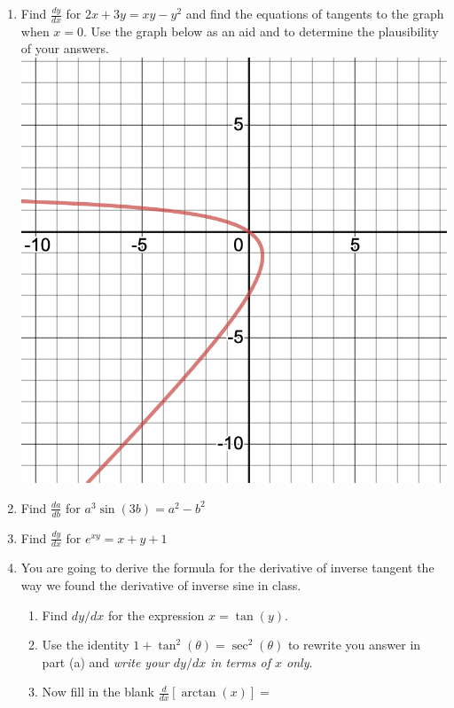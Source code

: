 \documentclass[11pt,fleqn]{article}
\begin{document}
\setlength{\parindent}{0cm}
\renewcommand{\headrulewidth}{0pt}
\newcommand{\blank}[1]{\rule{#1}{0.75pt}}
\renewcommand{\d}{\displaystyle}
\vspace*{-0.7in}
\begin{center}
 {\large{ }}
\end{center}
\begin{enumerate}
\item Find $\frac{dy}{dx}$ for $2x+3y=xy-y^{2}$ and find the equations of tangents to the graph when $x=0.$ Use the graph below as an aid and to determine the plausibility of your answers.\\


\includegraphics[scale=.25]{implicitgraph}

	
\item Find $\frac{da}{db}$ for $a^3\sin(3b)=a^2-b^2$
	\vfill
\item Find $\frac{dy}{dx}$ for $e^{xy}=x+y+1$
	\vfill

\newpage

\item You are going to derive the formula for the derivative of inverse tangent the way we found the derivative of inverse sine in class. 
	\begin{enumerate}
	\item Find $dy/dx$ for the expression $x=\tan(y).$
	\vfill
	\item Use the identity $1+\tan^2(\theta)=\sec^2(\theta)$ to rewrite you answer in part (a) and \emph{write your $dy/dx$ in terms of $x$ only}.
	\vfill
	\item Now fill in the blank $\d{\frac{d}{dx}\left[ \arctan(x)\right]}=$\\
	

\end{enumerate}
\end{enumerate}
\end{document}
